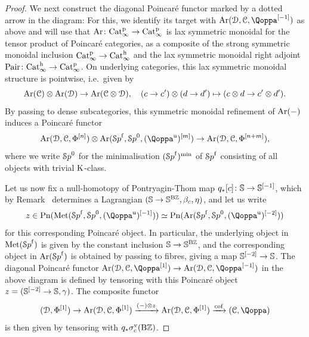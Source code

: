 \begin{proof}
We next construct the diagonal Poincar\'e functor marked by a dotted arrow in the diagram: For this, we identify its target with $\Ar(\D, \C, \QF\qshift{-1})$ as above and will use that $\operatorname{Ar}\colon \mathrm{Cat}^{\mathrm p}_\infty\to \mathrm{Cat}^{\mathrm p}_\infty$ is lax symmetric monoidal for the tensor product of Poincar\'e categories, as a composite of the strong symmetric monoidal inclusion $\mathrm{Cat}^{\mathrm p}_\infty\to \mathrm{Cat}^\mathrm{h}_\infty$ and the lax symmetric monoidal right adjoint $\operatorname{Pair}\colon \mathrm{Cat}^\mathrm{h}_\infty\to \mathrm{Cat}^{\mathrm p}_\infty$. On underlying categories, this lax symmetric monoidal structure is pointwise, i.e.\ given by 
\[
\operatorname{Ar}(\mathcal C)\otimes \operatorname{Ar}(\mathcal{D})\to \operatorname{Ar}(\mathcal C\otimes \mathcal{D}), \quad (c\to c')\otimes (d\to d') \mapsto (c\otimes d\to c'\otimes d').
\]
By passing to dense subcategories, this symmetric monoidal refinement of $\operatorname{Ar}(-)$ induces a Poincar\'e functor 
\[
\Ar(\D, \C, \QFD\qshift n)\otimes \Ar(\Spaf, \Spa^0, (\QF^{\uni})\qshift m)\to \Ar(\D, \C, \QFD\qshift{n+m}),
\]
where we write ${\mathcal Sp}^0$ for the minimalisation $({\mathcal Sp}^{\mathrm{f}})^{\min}$ of ${\mathcal Sp}^{\mathrm{f}}$ consisting of all objects with trivial $\operatorname K$-class. 


Let us now fix a null-homotopy of Pontryagin-Thom map %
$q_*[c]\colon \mathbb{S} \to \mathbb{S}^{[-1]}$,
which by Remark~
determines %
a Lagrangian $(\mathbb{S} \to \mathbb{S}^{\mathrm{B}\mathbb{Z}},\beta_c,\eta)$, and let us write 
\[
z \in \Poinc(\Met(\Spaf, \Spa^0, (\QF^{\uni})\qshift{-1}))\simeq \Poinc(\Ar(\Spaf, \Spa^0, (\QF^{\uni})\qshift{-2}))
\]
for this corresponding Poincaré object.
In particular, the underlying object in $\operatorname{Met}({\mathcal Sp}^{\mathrm{f}})$ is given by the constant inclusion $\mathbb{S}\to \mathbb{S}^{\mathrm{B}\mathbb{Z}}$, and the corresponding object in $\operatorname{Ar}({\mathcal Sp}^{\mathrm{f}})$ is obtained by passing to fibres, giving a map $\mathbb{S}^{[-2]}\to \mathbb{S}$. 
The diagonal Poincar\'e functor $\Ar(\D, \C, \QF\qshift{1}) \to \Ar(\D, \C, \QF\qshift{-1})$ in the above diagram is defined by tensoring with this Poincar\'e object $z = (\mathbb{S}^{[-2]} \to \mathbb{S},\gamma)$. The composite functor
\[
(\D,\QFD\qshift{1})  \to \Ar(\D,\C,\QFD\qshift{1}) \xrightarrow{(-)\otimes z} \Ar(\D,\C,\QFD\qshift{1}) \xrightarrow{\cof} (\C,\QF)
\]
is then given by tensoring with $q_*\sigma^{\mathrm{v}}_c(\mathrm{B}\mathbb{Z})$.



\end{proof}
